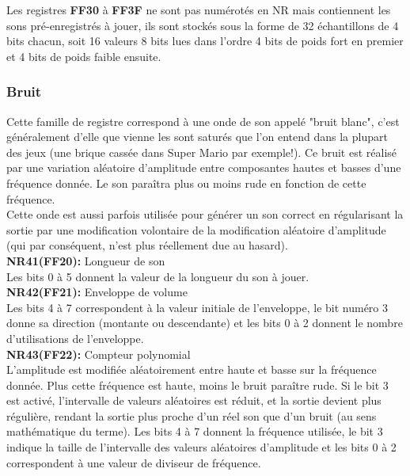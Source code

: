 \documentclass{report}
\begin{document}
		Les registres \textbf{FF30} à \textbf{FF3F} ne sont pas numérotés en NR
		mais contiennent les sons pré-enregistrés à jouer, ils
		sont stockés sous la forme de 32 échantillons de 4
		bits chacun, soit 16 valeurs 8 bits lues dans l'ordre
		4 bits de poids fort en premier et 4 bits de poids
		faible ensuite.

	\subsubsection{Bruit}
		Cette famille de registre correspond à une onde de son
		appelé "bruit blanc", c'est généralement d'elle que
		vienne les sont saturés que l'on entend dans la
		plupart des jeux (une brique cassée dans Super Mario
		par exemple!). 
		Ce bruit est réalisé par une variation aléatoire
		d'amplitude entre composantes hautes et basses d'une
		fréquence donnée. Le son paraîtra plus ou moins rude
		en fonction de cette fréquence. \\
		Cette onde est aussi parfois utilisée pour générer un
		son correct en régularisant la sortie par une
		modification volontaire de la modification aléatoire
		d'amplitude (qui par conséquent, n'est plus réellement
		due au hasard). \\

		\textbf{NR41(FF20):} Longueur de son \\
		Les bits 0 à 5 donnent la valeur de la longueur du son
		à jouer.\\

		\textbf{NR42(FF21):} Enveloppe de volume\\
		Les bits 4 à 7 correspondent à la valeur initiale de
		l'enveloppe, le bit numéro 3 donne sa direction
		(montante ou descendante) et les bits 0 à 2 donnent le
		nombre d'utilisations de l'enveloppe.\\

		\textbf{NR43(FF22):} Compteur polynomial \\
		L'amplitude est modifiée aléatoirement entre haute et
		basse sur la fréquence donnée. Plus cette fréquence
		est haute, moins le bruit paraître rude. 
		Si le bit 3 est activé, l'intervalle de valeurs
		aléatoires est réduit, et la sortie devient plus
		régulière, rendant la sortie plus proche d'un réel
		son que d'un bruit (au sens mathématique du terme).
		Les bits 4 à 7 donnent la fréquence utilisée, le bit 3
		indique la taille de l'intervalle des valeurs
		aléatoires d'amplitude et les bits 0 à 2 correspondent
		à une valeur de diviseur de fréquence.\\ 
\end{document}
